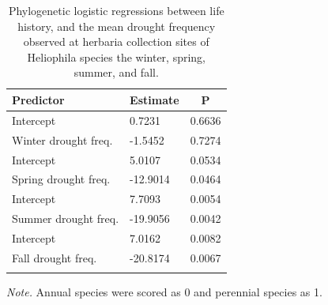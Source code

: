 \documentclass[man,floatsintext]{apa6}
\theoremstyle{definition}
\theoremstyle{definition}
\theoremstyle{definition}
\theoremstyle{remark}
\begin{document}
\begin{table}[tbp]
\begin{center}
\begin{threeparttable}
\caption{\label{tab:modelstable}Phylogenetic logistic regressions between life history, and the mean drought frequency observed at herbaria collection sites of Heliophila species the winter, spring, summer, and fall.}
\begin{tabular}{lll}
\toprule
Predictor & \multicolumn{1}{c}{Estimate} & \multicolumn{1}{c}{P}\\
\midrule
Intercept & 0.7231 & 0.6636\\
Winter drought freq. & -1.5452 & 0.7274\\ \midrule
Intercept & 5.0107 & 0.0534\\
Spring drought freq. & -12.9014 & 0.0464\\ \midrule
Intercept & 7.7093 & 0.0054\\
Summer drought freq. & -19.9056 & 0.0042\\ \midrule
Intercept & 7.0162 & 0.0082\\
Fall drought freq. & -20.8174 & 0.0067\\ \midrule
\bottomrule
\addlinespace
\end{tabular}
\begin{tablenotes}[para]
\normalsize{\textit{Note.} Annual species were scored as 0 and perennial species as 1.}
\end{tablenotes}
\end{threeparttable}
\end{center}
\end{table}
\end{document}
